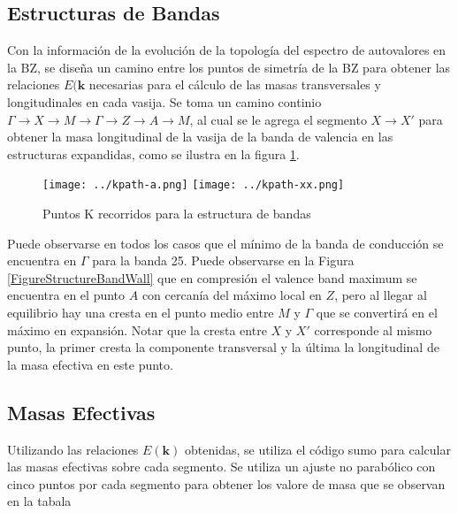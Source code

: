 \subsection{Estructuras de Bandas}

Con la información de la evolución de la topología del espectro de autovalores en 
la BZ, se diseña un camino entre los puntos de simetría de la BZ para obtener las 
relaciones  $E(\mathbf{k}$ necesarias para el cálculo de las masas transversales y
longitudinales en cada vasija. Se toma un camino continio $\Gamma \rightarrow X \rightarrow
M \rightarrow \Gamma \rightarrow Z \rightarrow A \rightarrow M$, al cual se le agrega el segmento 
$ X \rightarrow X' $ para obtener la masa longitudinal de la vasija de la banda de valencia 
en las estructuras expandidas, como se ilustra en la figura \ref{FiguraKPath}.

\begin{figure}
  \centering
  \texttt{[image: ../kpath-a.png]}
  \texttt{[image: ../kpath-xx.png]}
  \caption{\label{FiguraKPath} Puntos K recorridos para la estructura de bandas}
\end{figure}

Puede observarse en todos los casos que el mínimo de la banda de conducción
se encuentra en $\Gamma$ para la banda 25. 
Puede observarse en la Figura \ref{FigureStructureBandWall} que en compresión
el valence band maximum se encuentra en el punto $A$ con cercanía del máximo 
local en $Z$, pero al llegar al equilibrio hay una cresta en el punto medio entre 
$M$ y $\Gamma$  que se convertirá en el máximo en expansión. Notar que la cresta entre 
$X$ y $X'$ corresponde al mismo punto, la primer cresta la componente transversal y 
la última la longitudinal de la masa efectiva en este punto.

\subsection{Masas Efectivas}

Utilizando las relaciones $E(\mathbf{k})$ obtenidas, se utiliza el código 
sumo \cite{MGanose2018} para calcular las masas efectivas sobre 
cada segmento. Se utiliza un ajuste no parabólico con cinco puntos por cada 
segmento para obtener los valore de masa que se observan en la tabala

